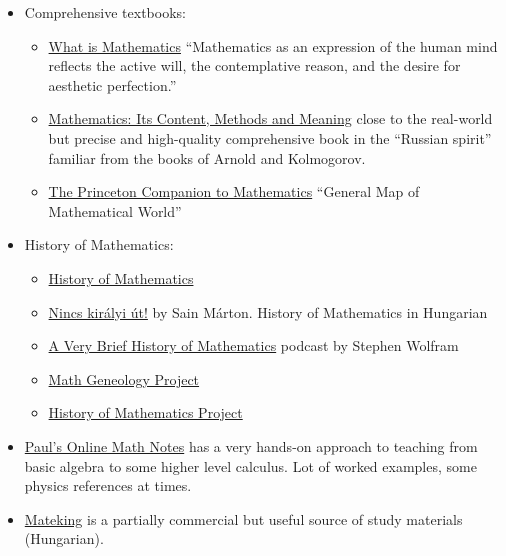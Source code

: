 \documentclass{article}
\begin{document}
\begin{itemize}
    \item Comprehensive textbooks:
    \begin{itemize}
        \item \href{https://www.goodreads.com/book/show/584620.What_Is_Mathematics_}{What is Mathematics} ``Mathematics as an expression of the human mind reflects the active will, the contemplative reason, and the desire for aesthetic perfection.''
        
        \item \href{https://www.goodreads.com/book/show/405880.Mathematics}{Mathematics: Its Content, Methods and Meaning} close to the real-world but precise and high-quality comprehensive book in the ``Russian spirit'' familiar from the books of Arnold and Kolmogorov.
        
        \item \href{https://www.goodreads.com/book/show/1471873.The_Princeton_Companion_to_Mathematics}{The Princeton Companion to Mathematics} ``General Map of Mathematical World''
    \end{itemize}
    
    \item History of Mathematics:
    \begin{itemize}
        \item \href{https://www.goodreads.com/book/show/786570.A_History_of_Mathematics}{History of Mathematics}
        \item \href{https://mek.oszk.hu/05000/05052/}{Nincs királyi út!} by Sain Márton. History of Mathematics in Hungarian
        \item \href{https://soundcloud.com/stephenwolfram/a-very-brief-history-of-mathematics}{A Very Brief History of Mathematics} podcast by Stephen Wolfram
        \item \href{https://genealogy.math.ndsu.nodak.edu/index.php}{Math Geneology Project}
        \item \href{https://history-of-mathematics.org/}{History of Mathematics Project}
    \end{itemize}
    
    
    
    \item \href{https://tutorial.math.lamar.edu/}{Paul's Online Math Notes} has a very hands-on approach to teaching from basic algebra to some higher level calculus. Lot of worked examples, some physics references at times.
    
    \item \href{https://www.mateking.hu/}{Mateking} is a partially commercial but useful source of study materials (Hungarian).
    

\end{itemize}
\end{document}
